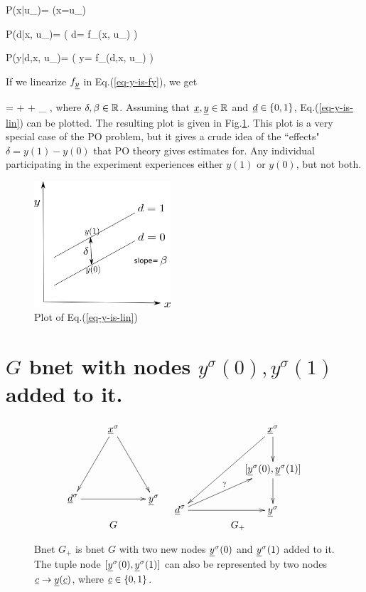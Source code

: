 \beq \color{blue}
P(x|u_\rvx)= \indi(\;\;x=u_\rvx\;\;)
\eeq

\beq\color{blue}
P(d|x, u_\rvd)=
\indi( \;\; d= f_\rvd(x, u_\rvd)
\;\;)
\eeq

\beq\color{blue}
P(y|d,x, u_\rvy)=
\indi( \;\; y= f_\rvy(d,x, u_\rvy)
\;\;)
\label{eq-y-is-fy}
\eeq

If we linearize
 $f_{\underline{y}}$ in Eq.(\ref{eq-y-is-fy}),
we get

\beqa
\rvy =
\delta \rvd + \beta \rvx + \rvu_\rvy
\;,
\label{eq-y-is-lin}
\eeqa
where $\delta, \beta\in { \mathbb{R}}$.
Assuming
that ${\underline{x}}, {\underline{y}}\in { \mathbb{R}}$
and ${\underline{d}}\in \{0,1\}$,
Eq.(\ref{eq-y-is-lin}) can be plotted.
The resulting plot
is given in Fig.\ref{fig-po-two-parallel-lines}.
This plot
is a very special
case of the PO problem,
but it gives a crude idea
of the ``effects" $\delta
= y(1)-y(0)$ that PO theory 
gives estimates for.
Any 
individual participating in the experiment
experiences either $y(1)$
or $y(0)$,
but not both.



\begin{figure}[h!]
\centering
\includegraphics[width=2in]
{pot-out/two-parallel-lines.png}
\caption{Plot  of
Eq.(\ref{eq-y-is-lin})} 
\label{fig-po-two-parallel-lines}
\end{figure}






\section{$G$ bnet
with nodes $y^\sigma(0),
y^\sigma(1)$ added to it.}


\begin{figure}[h!]
$$
\begin{array}{ccccc}
\xymatrix{
&\rvx^\s\ar[ddl]\ar[ddr]
\\
\\
\rvd^\s\ar[rr]&&\rvy^\s
}
&
\xymatrix{
&&\rvx^\s\ar[ddll]\ar[d]
\\
&&[\rvy^\s(0),\rvy^\s(1)]\ar[d]
\\
\rvd^\s\ar[urr]^?\ar[rr]
&
&\rvy^\s
}
\\
G&G_{+}
\end{array}
$$
\caption{
Bnet $G_+$ is bnet $G$
with two new nodes ${\underline{y}}^\sigma(0)$
and ${\underline{y}}^\sigma(1)$
added to it.
The tuple node $[{\underline{y}}^\sigma(0), {\underline{y}}^\sigma(1)]$
can also be represented by
two nodes ${\underline{c}}\rightarrow{\underline{y}}({\underline{c}})$,
where ${\underline{c}}\in \{0,1\}$.
} 
\label{fig-po-G-im-y0-y1}
\end{figure}



